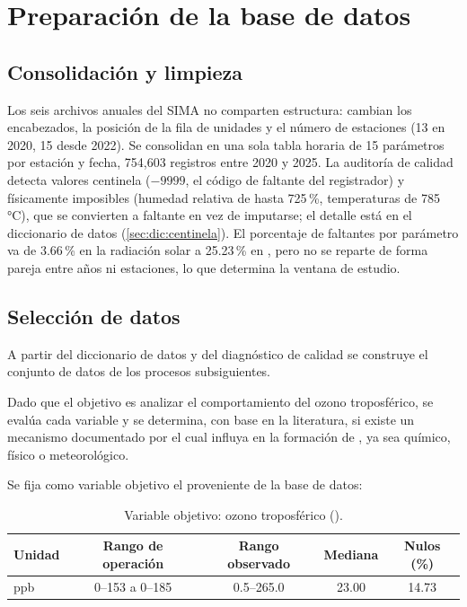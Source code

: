 \section{Preparación de la base de datos}
\label{sec:preparacion-datos}

\subsection{Consolidación y limpieza}

Los seis archivos anuales del SIMA no comparten estructura: cambian los
encabezados, la posición de la fila de unidades y el número de estaciones
(13 en 2020, 15 desde 2022). Se consolidan en una sola tabla horaria de 15
parámetros por estación y fecha, 754,603 registros entre 2020 y 2025. La
auditoría de calidad detecta valores centinela ($-9999$, el código de
faltante del registrador) y físicamente imposibles (humedad relativa de
hasta 725\,\%, temperaturas de 785\,°C), que se convierten a faltante en vez
de imputarse; el detalle está en el diccionario de datos
(\cref{sec:dic:centinela}). El porcentaje de faltantes por parámetro va de
3.66\,\% en la radiación solar a 25.23\,\% en , pero no se reparte
de forma pareja entre años ni estaciones, lo que determina la ventana de
estudio.

\subsection{Selección de datos}

A partir del diccionario de datos y del diagnóstico de calidad se construye
el conjunto de datos de los procesos subsiguientes.

Dado que el objetivo es analizar el comportamiento del ozono troposférico, se evalúa cada variable y se determina, con base en la literatura, si existe un mecanismo documentado por el cual influya en la formación de , ya sea químico, físico o meteorológico.

Se fija como variable objetivo el  proveniente de la base de datos:

\begin{table}[pos=t]
  \centering
  \caption{Variable objetivo: ozono troposférico ().}
  \label{tab:variable-objetivo}
  \begin{tabular}{lcccc}
    \toprule
    Unidad & Rango de operación & Rango observado & Mediana & Nulos (\%) \\
    \midrule
    ppb & 0--153 a 0--185 & 0.5--265.0 & 23.00 & 14.73 \\
    \bottomrule
  \end{tabular}
\end{table}

